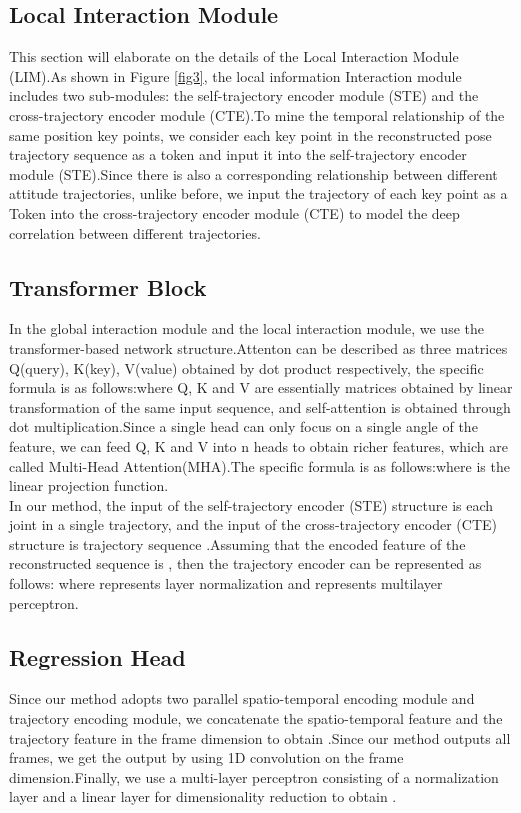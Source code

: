 \documentclass{article}
\begin{document}
\subsection{Local Interaction Module}
This section will elaborate on the details of the Local Interaction Module (LIM).As shown in Figure \ref{fig3}, the local information Interaction module includes two sub-modules: the self-trajectory encoder module (STE) and the cross-trajectory encoder module (CTE).To mine the temporal relationship of the same position key points, we consider each key point in the reconstructed pose trajectory sequence  as a token and input it into the self-trajectory encoder module (STE).Since there is also a corresponding relationship between different attitude trajectories, unlike before, we input the trajectory of each key point  as a Token into the cross-trajectory encoder module (CTE) to model the deep correlation between different trajectories.
\subsection{Transformer Block}
In the global interaction module and the local interaction module, we use the transformer-based network structure.Attenton can be described as three matrices Q(query), K(key), V(value) obtained by dot product respectively, the specific formula is as follows:where Q, K and V are essentially matrices obtained by linear transformation of the same input sequence, and self-attention is obtained through dot multiplication.Since a single head can only focus on a single angle of the feature, we can feed Q, K and V into n heads to obtain richer features, which are called Multi-Head Attention(MHA).The specific formula is as follows:where  is the linear projection function.\\
In our method, the input of the self-trajectory encoder (STE) structure is each joint  in a single trajectory, and the input of the cross-trajectory encoder (CTE) structure is  trajectory sequence .Assuming that the encoded feature of the reconstructed sequence  is , then the trajectory encoder can be represented as follows:  where  represents layer normalization and  represents multilayer perceptron.
\subsection{Regression Head}
Since our method adopts two parallel spatio-temporal encoding module and trajectory encoding module, we concatenate the spatio-temporal feature  and the trajectory feature  in the frame dimension to obtain .Since our method outputs all frames, we get the output  by using 1D convolution on the frame dimension.Finally, we use a multi-layer perceptron  consisting of a normalization layer and a linear layer for dimensionality reduction to obtain .
\end{document}
